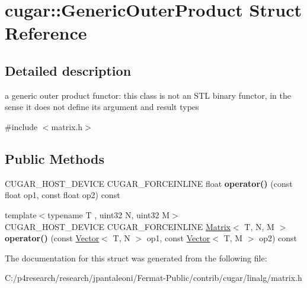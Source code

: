 \hypertarget{structcugar_1_1_generic_outer_product}{}\section{cugar\+:\+:Generic\+Outer\+Product Struct Reference}
\label{structcugar_1_1_generic_outer_product}


\subsection{Detailed description}
a generic outer product functor\+: this class is not an S\+TL binary functor, in the sense it does not define its argument and result types 

{\ttfamily \#include $<$matrix.\+h$>$}

\subsection*{Public Methods}
\begin{DoxyCompactItemize}
\item 
\mbox{\label{structcugar_1_1_generic_outer_product_a6499bf75f8fa72fd418fbfa448074f98}} 
C\+U\+G\+A\+R\+\_\+\+H\+O\+S\+T\+\_\+\+D\+E\+V\+I\+CE C\+U\+G\+A\+R\+\_\+\+F\+O\+R\+C\+E\+I\+N\+L\+I\+NE float {\bfseries operator()} (const float op1, const float op2) const
\item 
\mbox{\label{structcugar_1_1_generic_outer_product_ae3a417f7bb5701bedc4dc736e956aa8e}} 
{\footnotesize template$<$typename T , uint32 N, uint32 M$>$ }\\C\+U\+G\+A\+R\+\_\+\+H\+O\+S\+T\+\_\+\+D\+E\+V\+I\+CE C\+U\+G\+A\+R\+\_\+\+F\+O\+R\+C\+E\+I\+N\+L\+I\+NE \hyperlink{structcugar_1_1_matrix}{Matrix}$<$ T, N, M $>$ {\bfseries operator()} (const \hyperlink{structcugar_1_1_vector}{Vector}$<$ T, N $>$ op1, const \hyperlink{structcugar_1_1_vector}{Vector}$<$ T, M $>$ op2) const
\end{DoxyCompactItemize}


The documentation for this struct was generated from the following file\+:\begin{DoxyCompactItemize}
\item 
C\+:/p4research/research/jpantaleoni/\+Fermat-\/\+Public/contrib/cugar/linalg/matrix.\+h\end{DoxyCompactItemize}
